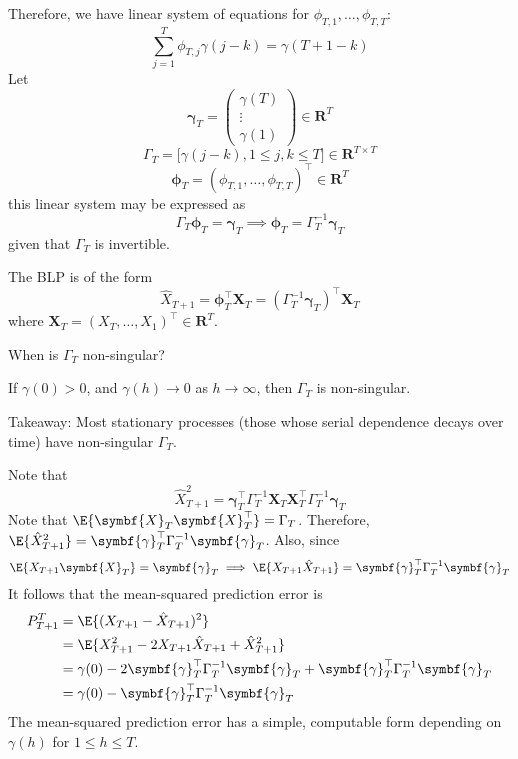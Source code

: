 Therefore, we have linear system of equations for $ \phi_{T,1},\ldots,\phi_{T,T} $:
\[ \sum_{j=1}^{T}\phi_{T,j}\gamma(j-k)=\gamma(T+1-k)  \]
Let
\[ \symbf{\gamma}_T=\begin{pmatrix}
        \gamma(T) \\
        \vdots    \\
        \gamma(1)
    \end{pmatrix}\in\mathbf{R}^T \]
\[ \Gamma_T=\bigl[\gamma(j-k),1\le j,k\le T\bigr]\in\mathbf{R}^{T\times T} \]
\[ \symbf{\phi}_T=(\phi_{T,1},\ldots,\phi_{T,T})^\top \in\mathbf{R}^T \]
this linear system may be expressed as
\[ \Gamma_T \symbf{\phi}_T=\symbf{\gamma}_T\implies \symbf{\phi}_T=\Gamma_T^{-1}\symbf{\gamma}_T \]
given that $ \Gamma_T $ is invertible.

The BLP is of the form
\[ \hat{X}_{T+1}=\symbf{\phi}_T^\top \symbf{X}_T=(\Gamma_T^{-1}\symbf{\gamma}_T)^\top \symbf{X}_T \]
where $ \symbf{X}_T=(X_{T},\ldots,X_1)^\top\in \mathbf{R}^T $.

When is $ \Gamma_T $ non-singular?
\begin{Theorem}{}{}
    If $ \gamma(0)>0 $, and $ \gamma(h)\to 0 $ as $ h\to\infty $, then
    $ \Gamma_T $ is non-singular.
\end{Theorem}
Takeaway: Most stationary processes (those whose serial dependence decays
over time) have non-singular $ \Gamma_T $.

Note that
\[ \hat{X}_{T+1}^2=\symbf{\gamma}_T^\top \Gamma_T^{-1}\symbf{X}_T \symbf{X}_T^\top
    \Gamma_T^{-1}\symbf{\gamma}_T \]
Note that $ \E{\symbf{X}_T \symbf{X}_T^\top}=\Gamma_T $.
Therefore, $ \E{\hat{X}_{T+1}^2}=\symbf{\gamma}_T^\top \Gamma_T^{-1} \symbf{\gamma}_T $.
Also, since
\[ \E{X_{T+1}\symbf{X}_T}=\symbf{\gamma}_T\implies
    \E{X_{T+1}\hat{X}_{T+1}}=\symbf{\gamma}_T^\top \Gamma_T^{-1}\symbf{\gamma}_T \]
It follows that the mean-squared prediction error is
\begin{align*}
    P_{T+1}^T
     & =\E{(X_{T+1}-\hat{X}_{T+1})^2}                                                                                       \\
     & =\E{X_{T+1}^2-2 X_{T+1}\hat{X}_{T+1}+\hat{X}_{T+1}^2}                                                                \\
     & =\gamma(0)-2 \symbf{\gamma}_T^\top \Gamma_T^{-1}\symbf{\gamma}_T+\symbf{\gamma}_T^\top \Gamma_T^{-1}\symbf{\gamma}_T \\
     & =\gamma(0)-\symbf{\gamma}_T^\top\Gamma_T^{-1}\symbf{\gamma}_T
\end{align*}
The mean-squared prediction error has a simple, computable
form depending on $ \gamma(h) $ for $ 1\le h\le T $.

